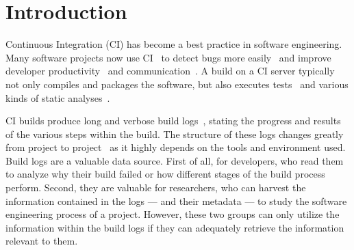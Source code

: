 \documentclass[\myrootdir/main.tex]{subfiles}
\begin{document}
\chapter{Introduction}



Continuous Integration (CI) has become a best practice in software engineering.
Many software projects now use CI~\cite{hilton2016usage,staahl2014modeling,beller2017oops} to detect bugs more easily~\cite{vasilescu2015quality,duvall2007continuous} and improve developer productivity~\cite{miller2008hundred,hilton2016usage} and communication~\cite{downs2012ambient}.
A build on a CI server typically not only compiles and packages the software, but also executes tests~\cite{beller2017oops} and various kinds of static analyses~\cite{zampetti2017open}.

CI builds produce long and verbose build logs~\cite{beller2017oops}, stating the progress and results of the various steps within the build. The structure of these logs changes greatly from project to project~\cite{staahl2014modeling} as it highly depends on the tools and environment used.
Build logs are a valuable data source. First of all, for developers, who read them to analyze why their build failed or how different stages of the build process perform.
Second, they are valuable for researchers, who can harvest the information contained in the logs --- and their metadata --- to study the software engineering process of a project.
However, these two groups can only utilize the information within the build logs if they can adequately retrieve the information relevant to them.
\end{document}
